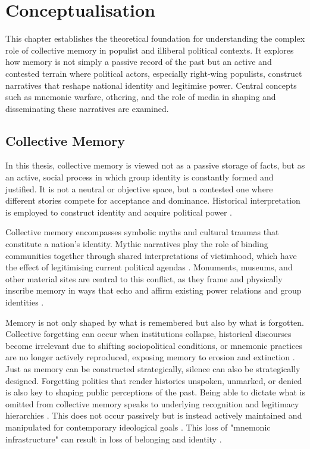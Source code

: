 \chapter[Conceptualisation]{Conceptualisation}
\label{Chap:Conceptualisation}

This chapter establishes the theoretical foundation for understanding the complex role of collective memory in populist and illiberal political contexts. It explores how memory is not simply a passive record of the past but an active and contested terrain where political actors, especially right-wing populists, construct narratives that reshape national identity and legitimise power. Central concepts such as mnemonic warfare, othering, and the role of media in shaping and disseminating these narratives are examined.

\section{Collective Memory}

In this thesis, collective memory is viewed not as a passive storage of facts, but as an active, social process in which group identity is constantly formed and justified. It is not a neutral or objective space, but a contested one where different stories compete for acceptance and dominance. Historical interpretation is employed to construct identity and acquire political power \citep{kapralski_battlefields_2001}.

Collective memory encompasses symbolic myths and cultural traumas that constitute a nation's identity. Mythic narratives play the role of binding communities together through shared interpretations of victimhood, which have the effect of legitimising current political agendas \citep{stanczyk_commemorating_2014}. Monuments, museums, and other material sites are central to this conflict, as they frame and physically inscribe memory in ways that echo and affirm existing power relations and group identities \citep{kapralski_battlefields_2001}.

Memory is not only shaped by what is remembered but also by what is forgotten. Collective forgetting can occur when institutions collapse, historical discourses become irrelevant due to shifting sociopolitical conditions, or mnemonic practices are no longer actively reproduced, exposing memory to erosion and extinction \citep{foroughi_collective_2020}. Just as memory can be constructed strategically, silence can also be strategically designed. Forgetting politics that render histories unspoken, unmarked, or denied is also key to shaping public perceptions of the past. Being able to dictate what is omitted from collective memory speaks to underlying recognition and legitimacy hierarchies \citep{vinitzky-seroussi_unpacking_2010}. This does not occur passively but is instead actively maintained and manipulated for contemporary ideological goals \citep{stanczyk_commemorating_2014}. This loss of "mnemonic infrastructure" can result in loss of belonging and identity \citep{foroughi_collective_2020}.

